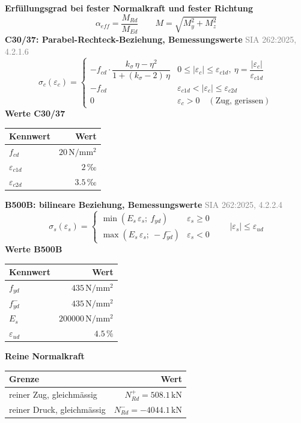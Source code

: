 \documentclass[11pt,a4paper]{article}
\newcommand{\normref}[1]{{\small\textcolor{gray}{#1}}}
\begin{document}
\noindent\textbf{Erfüllungsgrad bei fester Normalkraft und fester Richtung}
\begin{equation*}
\alpha_{eff} = \frac{M_{Rd}}{M_{Ed}} \qquad M = \sqrt{M_y^2 + M_z^2}
\end{equation*}
\noindent\textbf{C30/37: Parabel-Rechteck-Beziehung, Bemessungswerte} \hfill \normref{SIA 262:2025, 4.2.1.6}
\begin{equation*}
\sigma_c(\varepsilon_c) = \begin{cases} -f_{cd} \cdot \dfrac{k_\sigma\,\eta - \eta^2}{1 + (k_\sigma - 2)\,\eta} & 0 \le |\varepsilon_c| \le \varepsilon_{c1d},\ \eta = \dfrac{|\varepsilon_c|}{\varepsilon_{c1d}} \\[2ex] -f_{cd} & \varepsilon_{c1d} < |\varepsilon_c| \le \varepsilon_{c2d} \\[1ex] 0 & \varepsilon_c > 0 \quad (\text{Zug, gerissen}) \end{cases}
\end{equation*}
\noindent\textbf{Werte C30/37}
\begin{longtable}{lr}
\hline
Kennwert & Wert \\
\hline
\endhead
$f_{cd}$ & $20\,\mathrm{N}/\mathrm{mm}^{2}$ \\
$\varepsilon_{c1d}$ & $2\,\text{‰}$ \\
$\varepsilon_{c2d}$ & $3.5\,\text{‰}$ \\
\hline
\end{longtable}
\noindent\textbf{B500B: bilineare Beziehung, Bemessungswerte} \hfill \normref{SIA 262:2025, 4.2.2.4}
\begin{equation*}
\sigma_s(\varepsilon_s) = \begin{cases} \min(E_s\,\varepsilon_s;\ f_{yd}) & \varepsilon_s \ge 0 \\[1ex] \max(E_s\,\varepsilon_s;\ -f_{yd}^{-}) & \varepsilon_s < 0 \end{cases} \qquad |\varepsilon_s| \le \varepsilon_{ud}
\end{equation*}
\noindent\textbf{Werte B500B}
\begin{longtable}{lr}
\hline
Kennwert & Wert \\
\hline
\endhead
$f_{yd}$ & $435\,\mathrm{N}/\mathrm{mm}^{2}$ \\
$f_{yd}^{-}$ & $435\,\mathrm{N}/\mathrm{mm}^{2}$ \\
$E_s$ & $200000\,\mathrm{N}/\mathrm{mm}^{2}$ \\
$\varepsilon_{ud}$ & $4.5\,\%$ \\
\hline
\end{longtable}
\noindent\textbf{Reine Normalkraft}
\begin{longtable}{lr}
\hline
Grenze & Wert \\
\hline
\endhead
reiner Zug, gleichmässig & $N_{Rd}^{+} = 508.1\,\mathrm{kN}$ \\
reiner Druck, gleichmässig & $N_{Rd}^{-} = -4044.1\,\mathrm{kN}$ \\
\hline
\end{longtable}
\end{document}
